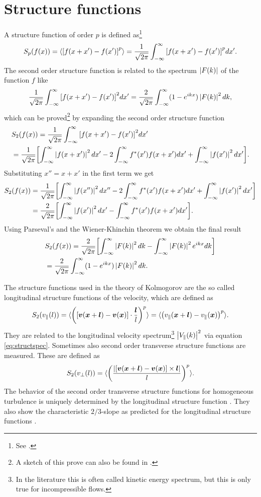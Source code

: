 \section{Structure functions} \label{structfunc}
A structure function of order $p$ is defined as\footnote{See
\citet{Pope2000}.}
\begin{align}
S_p(f(x))=\langle { \left[ f(x+x')-f(x') \right] }^p \rangle = \frac{1}{\sqrt{2\pi}} \int_{-\infty}^{\infty} { \left[ f(x+x')-f(x') \right] }^p
dx'.
\end{align}
The second order structure function is related to the spectrum
$\left\lvert F(k)\right\rvert$ of the function $f$ like
\begin{align}
\frac{1}{\sqrt{2\pi}} \int_{-\infty}^{\infty} { \left[ f(x+x')-f(x') \right] }^2 dx' = \frac{2}{\sqrt{2\pi}}\int_{-\infty}^{\infty} (1-e^{ikx})
\left\lvert F(k)\right\rvert^2 dk, \label{eq:structspec}
\end{align}
which can be proved\footnote{A sketch of this prove can also be found in
\citet[Appendix G]{Pope2000}.} by expanding the second order structure function 
\begin{align*}
&S_2(f(x))=\frac{1}{\sqrt{2\pi}} \int_{-\infty}^{\infty} { \left[ f(x+x')-f(x') \right] }^2 dx'\\
&= \frac{1}{\sqrt{2\pi}} { \left[ \int_{-\infty}^{\infty} \left\lvert f(x+x')\right\rvert^2 dx' 
- 2 \int_{-\infty}^{\infty} f^*(x')f(x+x')dx'
+ \int_{-\infty}^{\infty} \left\lvert f(x')\right\rvert^2 dx' \right] }.
\end{align*}
Substituting $x''=x+x'$ in the first term we get
\begin{align*}
S_2(f(x)) &= \frac{1}{\sqrt{2\pi}} { \left[ \int_{-\infty}^{\infty} \left\lvert f(x'')\right\rvert^2 dx'' 
- 2\int_{-\infty}^{\infty} f^*(x')f(x+x')dx'
+\int_{-\infty}^{\infty} \left\lvert f(x')\right\rvert^2 dx' \right] }\\
&= \frac{2}{\sqrt{2\pi}} { \left[ \int_{-\infty}^{\infty} \left\lvert f(x')\right\rvert^2 dx'-\int_{-\infty}^{\infty} f^*(x')f(x+x')dx' \right] }.
\end{align*}
Using Parseval's and the Wiener-Khinchin theorem we obtain the final result
\begin{align*}
&S_2(f(x))=\frac{2}{\sqrt{2\pi}} { \left[ \int_{-\infty}^{\infty} \left\lvert F(k)\right\rvert^2 dk
-\int_{-\infty}^{\infty} \left\lvert F(k)\right\rvert^2 e^{ikx} dk \right] } \\
&= \frac{2}{\sqrt{2\pi}}\int_{-\infty}^{\infty} (1-e^{ikx})\left\lvert F(k)\right\rvert^2 dk. 
\end{align*}

The structure functions used in the theory of Kolmogorov
are the so called longitudinal structure functions of the velocity, which are
defined as
\begin{align}
S_2(v_{\parallel}(l)) =  
\langle { \left( { \left[ \boldsymbol{v}(\boldsymbol{x}+\boldsymbol{l})-\boldsymbol{v}(\boldsymbol{x}) \right] }\cdot
\frac{\boldsymbol{l}}{l} \right) }^p \rangle =
\langle { \left( v_{\parallel}(\boldsymbol{x}+\boldsymbol{l})-v_{\parallel}(\boldsymbol{x}) \right) }^p \rangle.
\end{align}
They are related to the longitudinal velocity
spectrum\footnote{In the literature this is often called
kinetic energy spectrum, but this is only true for
incompressible flows.} $\left\lvert V_{\parallel}(k)\right\rvert^2$ via equation
\eqref{eq:structspec}.
Sometimes also second order transverse structure functions are measured.
These are defined as
\begin{align}
S_2(v_{\perp}(l)) =  
\langle { \left( \frac{\left\lvert{ \left[ \boldsymbol{v}(\boldsymbol{x}+\boldsymbol{l})-\boldsymbol{v}(\boldsymbol{x}) \right] }\times
\boldsymbol{l}\right\rvert}{l} \right) }^p \rangle.
\end{align}
The behavior of the second order transverse structure functions for
homogeneous turbulence is uniquely determined by the longitudinal structure
function \citep[p. 192, Eqs. (6.28)]{Pope2000}. They also show the
characteristic $2/3$-slope as predicted for the longitudinal structure functions
\citep[p.60]{Frisch1995}.

